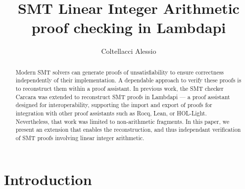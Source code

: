 \documentclass[runningheads]{llncs}
\begin{document}
\title{SMT Linear Integer Arithmetic proof checking in Lambdapi}


\author{Coltellacci Alessio
}
%
%

%
\maketitle
%
\begin{abstract}
Modern SMT solvers can generate proofs of unsatisfiability to ensure correctness independently of their implementation.
A dependable approach to verify these proofs is to reconstruct them within a proof assistant.
In previous work, the SMT checker Carcara was extended to reconstruct SMT proofs in Lambdapi — a proof assistant designed for interoperability,
supporting the import and export of proofs for integration with other proof assistants such as Rocq, Lean, or HOL-Light.
Nevertheless, that work was limited to non-arithmetic fragments. In this paper, we present an extension that enables the reconstruction, and thus independant verification of SMT proofs involving linear integer arithmetic.

\end{abstract}

\section{Introduction}
\end{document}
